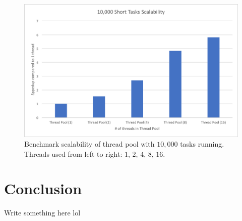 \documentclass[journal, a4paper]{IEEEtran}
\begin{document}
\begin{figure}[!hbt]
		\begin{center}
		\includegraphics[width=\columnwidth]{test_3.png}
		\caption{Benchmark scalability of thread pool with $10,000$ tasks running. Threads used from left to right: $1$, $2$, $4$, $8$, $16$.}
		\label{fig:tf_plot}
		\end{center}
	\end{figure}

\section{Conclusion}
	Write something here lol

\end{document}
